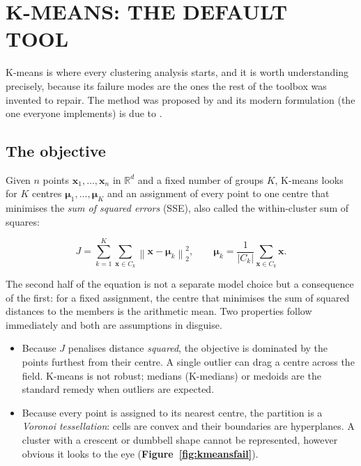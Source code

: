 \section{K-MEANS: THE DEFAULT TOOL}
\label{sec:kmeans}


K-means is where every clustering analysis starts, and it is worth
understanding precisely, because its failure modes are the ones the rest of the
toolbox was invented to repair. The method was proposed by \citet{MacQueen:67}
and its modern formulation (the one everyone implements) is due to
\citet{Lloyd:82}.

\subsection{The objective}

Given $n$ points $\mathbf{x}_1,\dots,\mathbf{x}_n$ in $\mathbb{R}^d$ and a
fixed number of groups $K$, K-means looks for $K$ centres
$\boldsymbol{\mu}_1,\dots,\boldsymbol{\mu}_K$ and an assignment of every point
to one centre that minimises the \emph{sum of squared errors} (SSE), also
called the within-cluster sum of squares:

\begin{equation}
J = \sum_{k=1}^{K} \sum_{\mathbf{x} \in C_k}
\left\| \mathbf{x} - \boldsymbol{\mu}_k \right\|_2^2 ,
\qquad
\boldsymbol{\mu}_k = \frac{1}{|C_k|}\sum_{\mathbf{x} \in C_k} \mathbf{x}.
\label{eq:sse}
\end{equation}

The second half of the equation is not a separate model choice but a
consequence of the first: for a fixed assignment, the centre that minimises
the sum of squared distances to the members is the arithmetic mean. Two
properties follow immediately and both are assumptions in disguise.

\begin{itemize}
\item Because $J$ penalises distance \emph{squared}, the objective is
  dominated by the points furthest from their centre. A single outlier can
  drag a centre across the field. K-means is not robust; medians (K-medians)
  or medoids are the standard remedy when outliers are expected.
\item Because every point is assigned to its nearest centre, the partition is
  a \emph{Voronoi tessellation}: cells are convex and their boundaries are
  hyperplanes. A cluster with a crescent or dumbbell shape cannot be
  represented, however obvious it looks to the eye
  (\textbf{Figure~\ref{fig:kmeansfail}}).
\end{itemize}

